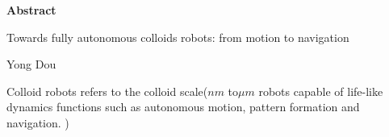 
\begin{titlepage}
\begin{center}

\vspace*{5\baselineskip}
\textbf{\large Abstract}

Towards fully autonomous  colloids robots: from motion to navigation

Yong Dou
\end{center}
\begin{flushleft}
\hspace{10mm}Colloid robots refers to the colloid scale($nm$ to$\mu m$ robots capable of life-like dynamics functions such as autonomous motion, pattern formation and navigation. )

\end{flushleft}
\vspace*{\fill}
\end{titlepage}
